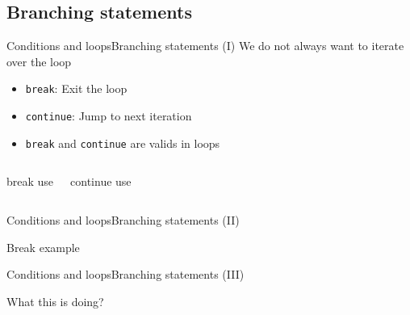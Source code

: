 \documentclass[10pt,compress]{beamer} %
\begin{document}
\subsection{Branching statements}
\begin{frame}{Conditions and loops}{Branching statements (I)}
	We do not always want  to iterate over the loop
	\begin{itemize}
	\item \texttt{break}: Exit the loop
	\item \texttt{continue}: Jump to next iteration
	\item \texttt{break} and \texttt{continue} are valids in loops
	\end{itemize}
	\vspace{-0.2cm}
    \begin{columns}
	\footnotesize{
		\begin{block}{break use}
		\vspace{-0.2cm}
		
		\vspace{-0.2cm}
		\end{block}
	}
	\footnotesize{
		\begin{block}{continue use}
		\vspace{-0.2cm}
		
		\vspace{-0.2cm}
		\end{block}
	}
	\end{columns}
\end{frame}

\begin{frame}{Conditions and loops}{Branching statements (II)}

 
		\begin{block}{Break example}
		\vspace{-0.2cm}
		
		\vspace{-0.2cm}
		\end{block}
	
\end{frame}

\begin{frame}{Conditions and loops}{Branching statements (III)}
	
 
		\begin{block}{What this is doing?}
		\vspace{-0.2cm}
		
		\vspace{-0.2cm}
		\end{block}
	
\end{frame}
\end{document}
